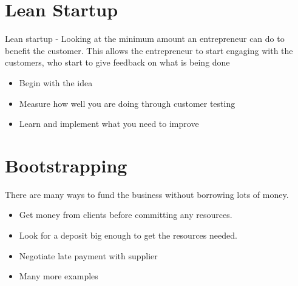 \documentclass{article}[18pt]
\begin{document}
\section{Lean Startup}
Lean startup - Looking at the minimum amount an entrepreneur can do to benefit the customer. This allows the entrepreneur to start engaging with the customers, who start to give feedback on what is being done
\begin{itemize}
	\item Begin with the idea
	\item Measure how well you are doing through customer testing
	\item Learn and implement what you need to improve
\end{itemize}
\section{Bootstrapping}
There are many ways to fund the business without borrowing lots of money.
\begin{itemize}
	\item Get money from clients before committing any resources.
	\item Look for a deposit big enough to get the resources needed.
	\item Negotiate late payment with supplier
	\item Many more examples
\end{itemize}
\end{document}

